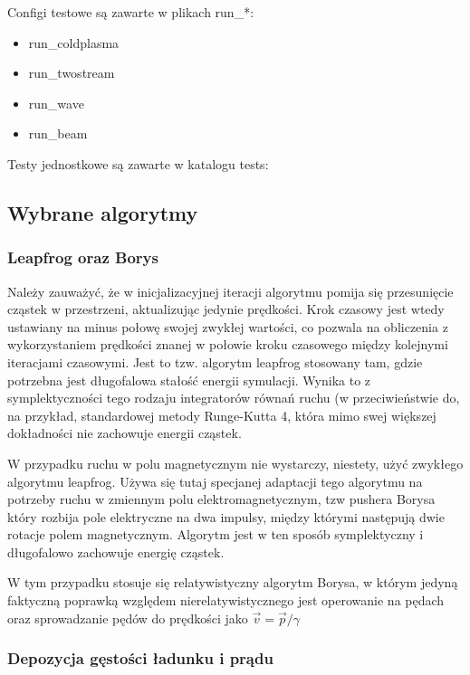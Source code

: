 Configi testowe są zawarte w plikach run\_*: %
\begin{itemize}
\item run\_coldplasma
\item run\_twostream
\item run\_wave
\item run\_beam
\end{itemize}

Testy jednostkowe są zawarte w katalogu tests:

\subsection{Wybrane algorytmy}

\subsubsection{Leapfrog oraz Borys} %
Należy zauważyć, że w inicjalizacyjnej iteracji algorytmu pomija się przesunięcie cząstek w przestrzeni, aktualizując jedynie
prędkości. Krok czasowy jest wtedy ustawiany na minus połowę swojej zwykłej wartości, co pozwala na obliczenia
z wykorzystaniem prędkości znanej w połowie kroku czasowego między kolejnymi iteracjami czasowymi. Jest to tzw. algorytm
leapfrog %
stosowany tam, gdzie potrzebna jest długofalowa stałość energii symulacji. Wynika to z symplektyczności %
tego rodzaju integratorów równań ruchu (w przeciwieństwie do, na przykład, standardowej metody Runge-Kutta 4, która
mimo swej większej dokładności nie zachowuje energii cząstek.

W przypadku ruchu w polu magnetycznym nie wystarczy, niestety, użyć zwykłego algorytmu leapfrog. %
Używa się tutaj specjanej adaptacji tego algorytmu na potrzeby ruchu w zmiennym polu elektromagnetycznym,
tzw pushera %
Borysa %
który rozbija pole elektryczne na dwa impulsy, między którymi następują dwie %
rotacje polem magnetycznym. Algorytm jest w ten sposób symplektyczny %
i długofalowo zachowuje energię cząstek.

W tym przypadku stosuje się relatywistyczny algorytm Borysa, w którym jedyną faktyczną poprawką względem
nierelatywistycznego jest operowanie na pędach oraz sprowadzanie pędów do prędkości jako $\vec{v} = \vec{p} / \gamma$ %

\subsubsection{Depozycja gęstości ładunku i prądu}
